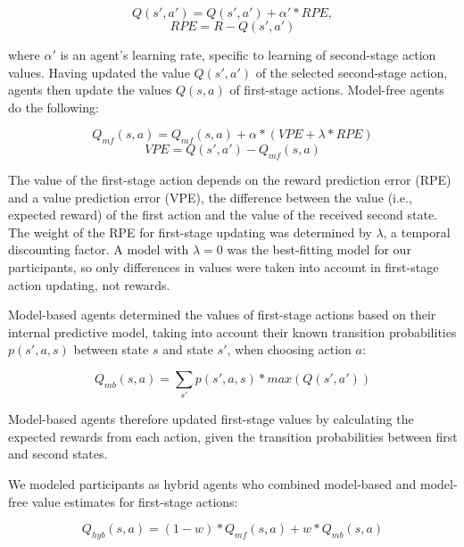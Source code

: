 \documentclass[11pt]{article} %
\begin{document}
\begin{equation}
Q(s', a') = Q(s', a') + \alpha' * RPE,
\end{equation}
\begin{equation}
RPE = R - Q(s', a')
\end{equation}

where $ \alpha' $ is an agent's learning rate, specific to learning of second-stage action values. Having updated the value $Q(s', a')$ of the selected second-stage action, agents then update the values $Q(s, a)$ of first-stage actions. Model-free agents do the following:

\begin{equation}
Q_{mf}(s, a) = Q_{mf}(s, a) + \alpha * (VPE + \lambda * RPE)
\end{equation}
\begin{equation}
VPE = Q(s', a') - Q_{mf}(s, a)
\end{equation}

The value of the first-stage action depends on the reward prediction error (RPE) and a value prediction error (VPE), the difference between the value (i.e., expected reward) of the first action and the value of the received second state. The weight of the RPE for first-stage updating was determined by $ \lambda $, a temporal discounting factor. A model with $ \lambda = 0 $ was the best-fitting model for our participants, so only differences in values were taken into account in first-stage action updating, not rewards.

Model-based agents determined the values of first-stage actions based on their internal predictive model, taking into account their known transition probabilities $p(s', a, s)$ between state $s$ and state $s'$, when choosing action $a$:

\begin{equation}
Q_{mb}(s, a) = \sum_{s'} p(s', a, s) * max(Q(s', a'))
\end{equation}

Model-based agents therefore updated first-stage values by calculating the expected rewards from each action, given the transition probabilities between first and second states.

We modeled participants as hybrid agents who combined model-based and model-free value estimates for first-stage actions:

\begin{equation}
Q_{hyb}(s, a) = (1 - w) * Q_{mf}(s, a) + w * Q_{mb}(s, a)
\end{equation}
\end{document}
